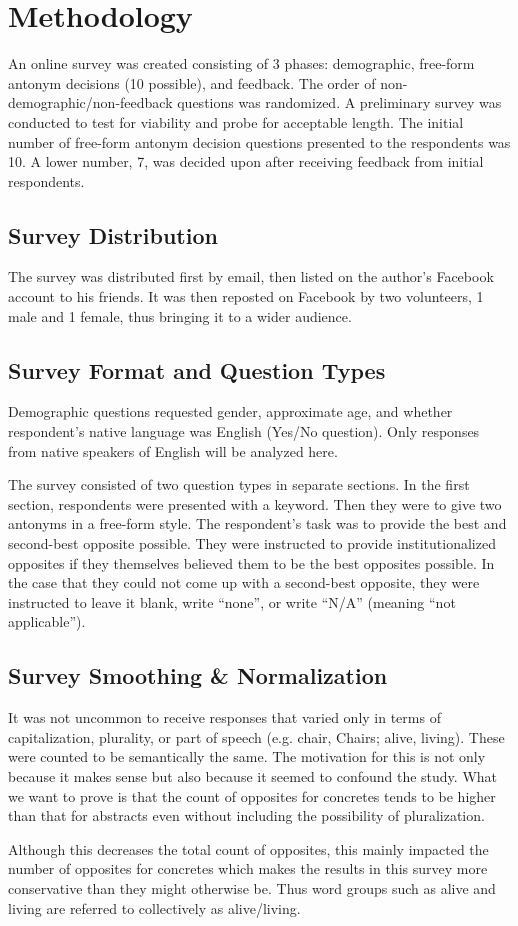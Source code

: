 \section {Methodology}
An online survey was created consisting of 3 phases: demographic, free-form antonym decisions (10 possible), and feedback.  The order of non-demographic/non-feedback questions was randomized.  A preliminary survey was conducted to test for viability and probe for acceptable length.  The initial number of free-form antonym decision questions presented to the respondents was 10.  A lower number, 7, was decided upon after receiving feedback from initial respondents.  

\subsection{Survey Distribution} The survey was distributed first by email, then listed on the author’s Facebook account to his friends.  It was then reposted on Facebook by two volunteers, 1 male and 1 female, thus bringing it to a wider audience.  

\subsection{Survey Format and Question Types} Demographic questions requested gender, approximate age, and whether respondent’s native language was English (Yes/No question).  Only responses from native speakers of English will be analyzed here. 

The survey consisted of two question types in separate sections. In the first section, respondents were presented with a keyword. Then they were to give two antonyms in a free-form style. The respondent’s task was to provide the best and second-best opposite possible.  They were instructed to provide institutionalized opposites if they themselves believed them to be the best opposites possible. In the case that they could not come up with a second-best opposite, they were instructed to leave it blank, write “none”, or write “N/A” (meaning “not applicable”).  

\subsection{Survey Smoothing \& Normalization} It was not uncommon to receive responses that varied only in terms of capitalization, plurality, or part of speech (e.g. chair, Chairs; alive, living).  These were counted to be semantically the same.  The motivation for this is not only because it makes sense but also because it seemed to confound the study.  What we want to prove is that the count of opposites for concretes tends to be higher than that for abstracts even without including the possibility of pluralization. 

Although this decreases the total count of opposites, this mainly impacted the number of opposites for concretes which makes the results in this survey more conservative than they might otherwise be.  Thus word groups such as alive and living are referred to collectively as alive/living. 
